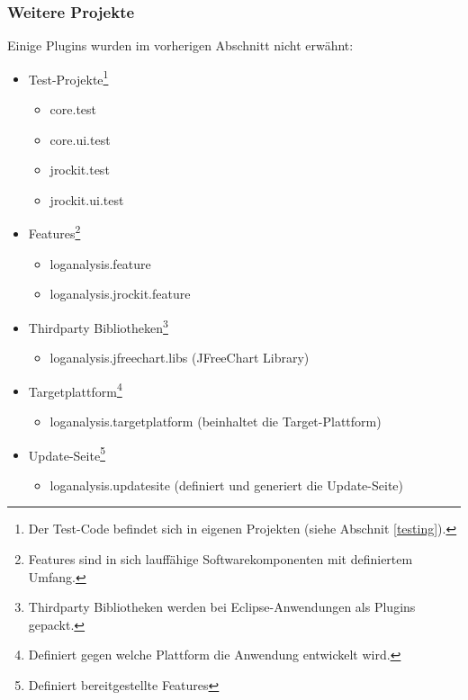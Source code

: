 \subsubsection{Weitere Projekte}
Einige Plugins wurden im vorherigen Abschnitt nicht erwähnt:
\begin{itemize}
	\item Test-Projekte\footnote{Der Test-Code befindet sich in eigenen Projekten (siehe Abschnit \ref{testing}).}
		\begin{itemize}
			\item core.test
			\item core.ui.test
			\item jrockit.test
			\item jrockit.ui.test
		\end{itemize}
	\item  Features\footnote{Features sind in sich lauffähige Softwarekomponenten mit definiertem Umfang.}
		\begin{itemize}
			\item loganalysis.feature
			\item loganalysis.jrockit.feature
		\end{itemize}
	\item  Thirdparty Bibliotheken\footnote{Thirdparty Bibliotheken werden bei Eclipse-Anwendungen als Plugins gepackt.}
		\begin{itemize}
			\item  loganalysis.jfreechart.libs (JFreeChart Library)
		\end{itemize}
	\item  Targetplattform\footnote{Definiert gegen welche Plattform die Anwendung entwickelt wird.}
		\begin{itemize}
			\item  loganalysis.targetplatform (beinhaltet die Target-Plattform)
		\end{itemize}
	\item  Update-Seite\footnote{Definiert bereitgestellte Features}
		\begin{itemize}
			\item loganalysis.updatesite (definiert und generiert die Update-Seite)
		\end{itemize}
\end{itemize}

